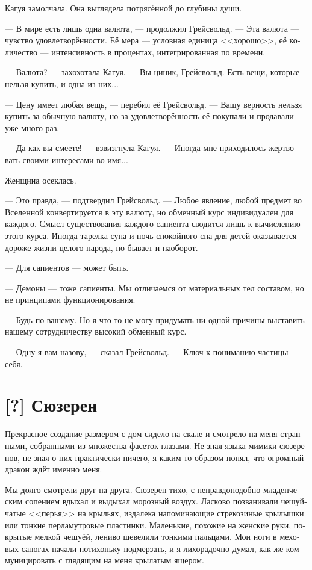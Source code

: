 \documentclass[a4paper,12pt,fleqn]{book}\usepackage{polyglossia}\setdefaultlanguage[babelshorthands=true]{russian}\setotherlanguage{english}\defaultfontfeatures{Ligatures=TeX,Mapping=tex-text}\usepackage{xcolor}\newcommand{\ml}[3]{#2}
\newcommand{\textspace}{\vspace{1em}{\centering\Large\bfseries<...>\par}\vspace{1em}}
\begin{document}
Кагуя замолчала.
Она выглядела потрясённой до глубины души.

--- В мире есть лишь одна валюта, --- продолжил Грейсвольд.
--- Эта валюта --- чувство удовлетворённости.
Её мера --- условная единица <<хорошо>>, её количество --- интенсивность в процентах, интегрированная по времени.

--- Валюта? --- захохотала Кагуя.
--- Вы циник, Грейсвольд.
Есть вещи, которые нельзя купить, и одна из них...

--- Цену имеет любая вещь, --- перебил её Грейсвольд.
--- Вашу верность нельзя купить за обычную валюту, но за удовлетворённость её покупали и продавали уже много раз.

--- Да как вы смеете! --- взвизгнула Кагуя.
--- Иногда мне приходилось жертвовать своими интересами во имя...

Женщина осеклась.

--- Это правда, --- подтвердил Грейсвольд.
--- Любое явление, любой предмет во Вселенной конвертируется в эту валюту, но обменный курс индивидуален для каждого.
Смысл существования каждого сапиента сводится лишь к вычислению этого курса.
Иногда тарелка супа и ночь спокойного сна для детей оказывается дороже жизни целого народа, но бывает и наоборот.

--- Для сапиентов --- может быть.

--- Демоны --- тоже сапиенты.
Мы отличаемся от материальных тел составом, но не принципами функционирования.

--- Будь по-вашему.
Но я что-то не могу придумать ни одной причины выставить нашему сотрудничеству высокий обменный курс.

--- Одну я вам назову, --- сказал Грейсвольд.
--- Ключ к пониманию частицы себя.

\textspace

\section{[?] Сюзерен}

\textspace

Прекрасное создание размером с дом сидело на скале и смотрело на меня странными, собранными из множества фасеток глазами.
Не зная языка мимики сюзеренов, не зная о них практически ничего, я каким-то образом понял, что огромный дракон ждёт именно меня.

Мы долго смотрели друг на друга.
Сюзерен тихо, с неправдоподобно младенческим сопением вдыхал и выдыхал морозный воздух.
Ласково позванивали чешуйчатые <<перья>> на крыльях, издалека напоминающие стрекозиные крылышки или тонкие перламутровые пластинки.
Маленькие, похожие на женские руки, покрытые мелкой чешуёй, лениво шевелили тонкими пальцами.
Мои ноги в меховых сапогах начали потихоньку подмерзать, и я лихорадочно думал, как же коммуницировать с глядящим на меня крылатым ящером.
\end{document}
